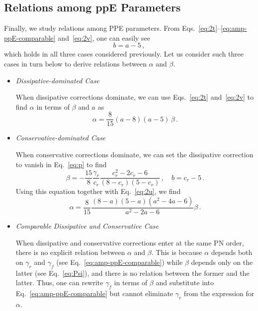\documentclass[prd,twocolumn,nofootinbib]{revtex4-1}
\begin{document}
\subsection{Relations among ppE Parameters}

Finally, we study relations among PPE parameters. From Eqs.~\eqref{eq:2t}--\eqref{eq:amp-ppE-comparable} and~\eqref{eq:2v}, one can easily see 
\begin{equation}
b=a-5\,,
\end{equation}
which holds in all three cases considered previously. Let us consider such three cases in turn below to derive relations between $\alpha$ and $\beta$. 

\begin{itemize}

\item
\emph{Dissipative-dominated Case}

When dissipative corrections dominate, we can use Eqs.~\eqref{eq:2t} and~\eqref{eq:2v} to find $\alpha$ in terms of $\beta$ and $a$ as
\begin{equation}\label{eq:2w2}
\alpha = \frac{8}{15} (a-8)(a-5) \, \beta\,.
\end{equation}


\item
\emph{Conservative-dominated Case}

When conservative corrections dominate, we can set the dissipative correction to vanish in Eq.~\eqref{eq:p} to find 
\begin{equation}\label{eq:2w}
\beta=-\frac{15}{8}\frac{\gamma_r}{c_r}\frac{c_r^2-2c_r-6}{(8-c_r)(5-c_r)}\,, \quad b=c_r-5\,.
\end{equation}
Using this equation together with Eq.~\eqref{eq:2u}, we find
\begin{equation}
\alpha =\frac{8}{15} \frac{(8-a)(5-a)(a^2-4a-6)}{a^2-2a-6} \beta\,.
\end{equation}


\item
\emph{Comparable Dissipative and Conservative Case}

When dissipative and conservative corrections enter at the same PN order, there is no explicit relation between $\alpha$ and $\beta$. This is because $\alpha$ depends both on $\gamma_r$ and $\gamma_{\dot f}$ (see Eq.~\eqref{eq:amp-ppE-comparable}) while $\beta$ depends only on the latter (see Eq.~\eqref{eq:Psi}), and there is no relation between the former and the latter. Thus, one can rewrite $\gamma_{\dot f}$ in terms of $\beta$ and substitute into Eq.~\eqref{eq:amp-ppE-comparable} but cannot eliminate $\gamma_r$ from the expression for $\alpha$. 

\end{itemize}
\end{document}

